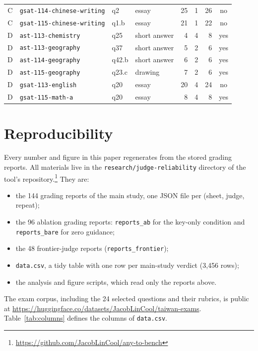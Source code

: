 \documentclass{article}
\begin{document}
\begin{table}[!ht]
\begin{tabular}{@{}clllrrrc@{}}
C & \texttt{gsat-114-chinese-writing} & q2 & essay & 25 & 1 & 26 & no \\
C & \texttt{gsat-115-chinese-writing} & q1.b & essay & 21 & 1 & 22 & no \\
\midrule
D & \texttt{ast-113-chemistry} & q25 & short answer & 4 & 4 & 8 & yes \\
D & \texttt{ast-113-geography} & q37 & short answer & 5 & 2 & 6 & yes \\
D & \texttt{ast-114-geography} & q42.b & short answer & 6 & 2 & 6 & yes \\
D & \texttt{ast-115-geography} & q23.c & drawing & 7 & 2 & 6 & yes \\
D & \texttt{gsat-113-english} & q20 & essay & 20 & 4 & 24 & no \\
D & \texttt{gsat-115-math-a} & q20 & essay & 8 & 4 & 8 & yes \\
\bottomrule
\end{tabular}
\end{table}

\section{Reproducibility}
\label{app:repro}

Every number and figure in this paper regenerates from the stored grading
reports. All materials live in the \texttt{research/judge-reliability}
directory of the tool's
repository.\footnote{\url{https://github.com/JacobLinCool/any-to-bench}}
They are:

\begin{itemize}\setlength\itemsep{0.1em}
\item the 144 grading reports of the main study, one JSON file per (sheet,
judge, repeat);
\item the 96 ablation grading reports: \texttt{reports\_ab} for the
key-only condition and \texttt{reports\_bare} for zero guidance;
\item the 48 frontier-judge reports (\texttt{reports\_frontier});
\item \texttt{data.csv}, a tidy table with one row per main-study verdict
(3{,}456 rows);
\item the analysis and figure scripts, which read only the reports above.
\end{itemize}

The exam corpus, including the 24 selected questions and their rubrics, is
public at \url{https://huggingface.co/datasets/JacobLinCool/taiwan-exams}.
Table~\ref{tab:columns} defines the columns of \texttt{data.csv}.
\end{document}
